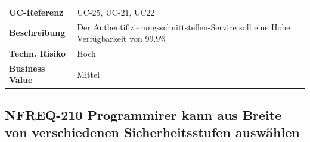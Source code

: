 \begin{longtable}[c]{@{}ll@{}}
\toprule
\begin{minipage}[t]{0.20\columnwidth}\raggedright\strut
\textbf{UC-Referenz}
\strut\end{minipage} &
\begin{minipage}[t]{0.74\columnwidth}\raggedright\strut
UC-25, UC-21, UC22
\strut\end{minipage}\tabularnewline
\begin{minipage}[t]{0.20\columnwidth}\raggedright\strut
\textbf{Beschreibung}
\strut\end{minipage} &
\begin{minipage}[t]{0.74\columnwidth}\raggedright\strut
Der Authentifizierungsschnittstellen-Service soll eine Hohe
Verfügbarkeit von 99.9\%
\strut\end{minipage}\tabularnewline
\begin{minipage}[t]{0.20\columnwidth}\raggedright\strut
\textbf{Techn. Risiko}
\strut\end{minipage} &
\begin{minipage}[t]{0.74\columnwidth}\raggedright\strut
Hoch
\strut\end{minipage}\tabularnewline
\begin{minipage}[t]{0.20\columnwidth}\raggedright\strut
\textbf{Business Value}
\strut\end{minipage} &
\begin{minipage}[t]{0.74\columnwidth}\raggedright\strut
Mittel
\strut\end{minipage}\tabularnewline
\bottomrule
\end{longtable}

\subsection{NFREQ-210 Programmirer kann aus Breite von verschiedenen
Sicherheitsstufen
auswählen}\label{nfreq-210-programmirer-kann-aus-breite-von-verschiedenen-sicherheitsstufen-auswuxe4hlen}

